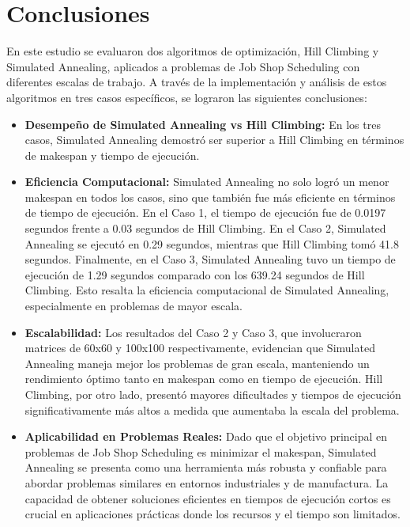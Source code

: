 \documentclass[11pt]{article}
\begin{document}
\section{Conclusiones}

En este estudio se evaluaron dos algoritmos de optimización, Hill Climbing y Simulated Annealing, aplicados a problemas de Job Shop Scheduling con diferentes escalas de trabajo. A través de la implementación y análisis de estos algoritmos en tres casos específicos, se lograron las siguientes conclusiones:

\begin{itemize}
\item \textbf{Desempeño de Simulated Annealing vs Hill Climbing:} En los tres casos, Simulated Annealing demostró ser superior a Hill Climbing en términos de makespan y tiempo de ejecución. 

\item \textbf{Eficiencia Computacional:} Simulated Annealing no solo logró un menor makespan en todos los casos, sino que también fue más eficiente en términos de tiempo de ejecución. En el Caso 1, el tiempo de ejecución fue de 0.0197 segundos frente a 0.03 segundos de Hill Climbing. En el Caso 2, Simulated Annealing se ejecutó en 0.29 segundos, mientras que Hill Climbing tomó 41.8 segundos. Finalmente, en el Caso 3, Simulated Annealing tuvo un tiempo de ejecución de 1.29 segundos comparado con los 639.24 segundos de Hill Climbing. Esto resalta la eficiencia computacional de Simulated Annealing, especialmente en problemas de mayor escala.

\item \textbf{Escalabilidad:} Los resultados del Caso 2 y Caso 3, que involucraron matrices de 60x60 y 100x100 respectivamente, evidencian que Simulated Annealing maneja mejor los problemas de gran escala, manteniendo un rendimiento óptimo tanto en makespan como en tiempo de ejecución. Hill Climbing, por otro lado, presentó mayores dificultades y tiempos de ejecución significativamente más altos a medida que aumentaba la escala del problema.

\item \textbf{Aplicabilidad en Problemas Reales:} Dado que el objetivo principal en problemas de Job Shop Scheduling es minimizar el makespan, Simulated Annealing se presenta como una herramienta más robusta y confiable para abordar problemas similares en entornos industriales y de manufactura. La capacidad de obtener soluciones eficientes en tiempos de ejecución cortos es crucial en aplicaciones prácticas donde los recursos y el tiempo son limitados.
\end{itemize}


 

\end{document}
